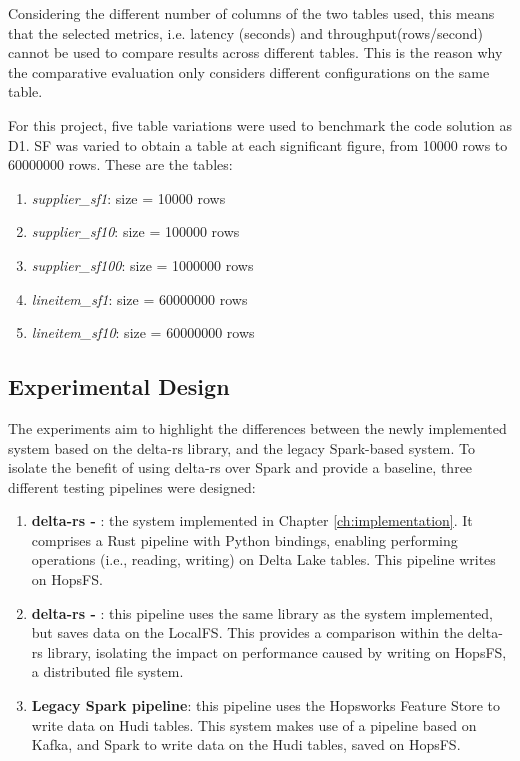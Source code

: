Considering the different number of columns of the two tables used, this means that the selected metrics, i.e. latency (seconds) and throughput(rows/second) cannot be used to compare results across different tables. This is the reason why the comparative evaluation only considers different configurations on the same table.

For this project, five table variations were used to benchmark the code solution as D1. \gls{SF} was varied to obtain a table at each significant figure, from 10000 rows to 60000000 rows. These are the tables:
\begin{enumerate}
    \item \textit{supplier\_sf1}: size = 10000 rows
    \item \textit{supplier\_sf10}: size = 100000 rows
    \item \textit{supplier\_sf100}: size = 1000000 rows
    \item \textit{lineitem\_sf1}: size = 60000000 rows
    \item \textit{lineitem\_sf10}: size = 60000000 rows
\end{enumerate}

\subsection{Experimental Design}
\label{subsec:experimental_design}
%

The experiments aim to highlight the differences between the newly implemented system based on the delta-rs library, and the legacy Spark-based system. To isolate the benefit of using delta-rs over Spark and provide a baseline, three different testing pipelines were designed:
\begin{enumerate}
    \item \textbf{delta-rs - }: the system implemented in Chapter \ref{ch:implementation}. It comprises a Rust pipeline with Python bindings, enabling performing operations (i.e., reading, writing) on Delta Lake tables. This pipeline writes on \gls{HopsFS}.
    \item \textbf{delta-rs - }: this pipeline uses the same library as the system implemented, but saves data on the \gls{LocalFS}. This provides a comparison within the delta-rs library, isolating the impact on performance caused by writing on \gls{HopsFS}, a distributed file system.
    \item \textbf{Legacy Spark pipeline}: this pipeline uses the Hopsworks Feature Store to write data on Hudi tables. This system makes use of a pipeline based on Kafka, and Spark to write data on the Hudi tables, saved on \gls{HopsFS}. 
\end{enumerate}

